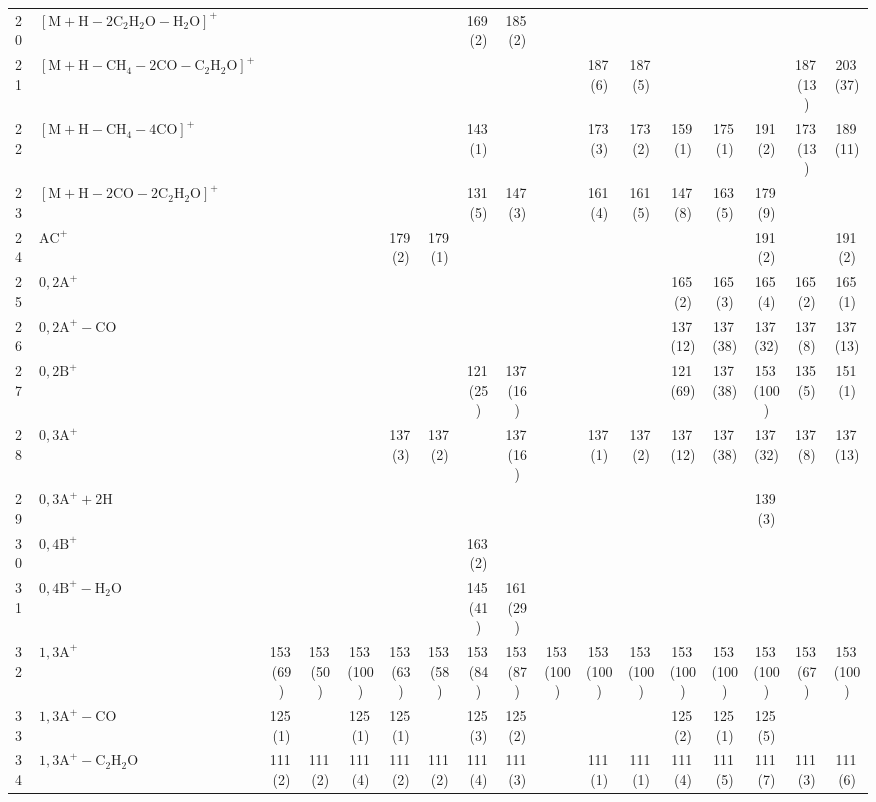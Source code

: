 \documentclass[]{article}
\begin{document}
\begin{table}
{\begin{tabular}{ll|ccccc|ccccc|ccccc}
  20 & $\mathrm{[M{+}H{-}2C_{2}H_{2}O{-}H_{2}O]^+}$ &  &  &  &  &  & 169\,(2) & 185\,(2) &  &  &  &  &  &  &  &  \\ 
  21 & $\mathrm{[M{+}H{-}CH_{4}{-}2CO{-}C_{2}H_{2}O]^+}$ &  &  &  &  &  &  &  &  & 187\,(6) & 187\,(5) &  &  &  & 187\,(13) & 203\,(37) \\ 
  22 & $\mathrm{[M{+}H{-}CH_{4}{-}4CO]^+}$ &  &  &  &  &  & 143\,(1) &  &  & 173\,(3) & 173\,(2) & 159\,(1) & 175\,(1) & 191\,(2) & 173\,(13) & 189\,(11) \\ 
  23 & $\mathrm{[M{+}H{-}2CO{-}2C_{2}H_{2}O]^+}$ &  &  &  &  &  & 131\,(5) & 147\,(3) &  & 161\,(4) & 161\,(5) & 147\,(8) & 163\,(5) & 179\,(9) &  &  \\ 
  24 & $\mathrm{AC^+}$ &  &  &  & 179\,(2) & 179\,(1) &  &  &  &  &  &  &  & 191\,(2) &  & 191\,(2) \\ 
  25 & $\mathrm{0{,}2A^+}$ &  &  &  &  &  &  &  &  &  &  & 165\,(2) & 165\,(3) & 165\,(4) & 165\,(2) & 165\,(1) \\ 
  26 & $\mathrm{0{,}2A^+{-}CO}$ &  &  &  &  &  &  &  &  &  &  & 137\,(12) & 137\,(38) & 137\,(32) & 137\,(8) & 137\,(13) \\ 
  27 & $\mathrm{0{,}2B^+}$ &  &  &  &  &  & 121\,(25) & 137\,(16) &  &  &  & 121\,(69) & 137\,(38) & 153\,(100) & 135\,(5) & 151\,(1) \\ 
  28 & $\mathrm{0{,}3A^+}$ &  &  &  & 137\,(3) & 137\,(2) &  & 137\,(16) &  & 137\,(1) & 137\,(2) & 137\,(12) & 137\,(38) & 137\,(32) & 137\,(8) & 137\,(13) \\ 
  29 & $\mathrm{0{,}3A^+{+}2H}$ &  &  &  &  &  &  &  &  &  &  &  &  & 139\,(3) &  &  \\ 
  30 & $\mathrm{0{,}4B^+}$ &  &  &  &  &  & 163\,(2) &  &  &  &  &  &  &  &  &  \\ 
  31 & $\mathrm{0{,}4B^+{-}H_{2}O}$ &  &  &  &  &  & 145\,(41) & 161\,(29) &  &  &  &  &  &  &  &  \\ 
  32 & $\mathrm{1{,}3A^+}$ & 153\,(69) & 153\,(50) & 153\,(100) & 153\,(63) & 153\,(58) & 153\,(84) & 153\,(87) & 153\,(100) & 153\,(100) & 153\,(100) & 153\,(100) & 153\,(100) & 153\,(100) & 153\,(67) & 153\,(100) \\ 
  33 & $\mathrm{1{,}3A^+{-}CO}$ & 125\,(1) &  & 125\,(1) & 125\,(1) &  & 125\,(3) & 125\,(2) &  &  &  & 125\,(2) & 125\,(1) & 125\,(5) &  &  \\ 
  34 & $\mathrm{1{,}3A^+{-}C_{2}H_{2}O}$ & 111\,(2) & 111\,(2) & 111\,(4) & 111\,(2) & 111\,(2) & 111\,(4) & 111\,(3) &  & 111\,(1) & 111\,(1) & 111\,(4) & 111\,(5) & 111\,(7) & 111\,(3) & 111\,(6) \\ 

\end{tabular}}
\end{table}
\end{document}
